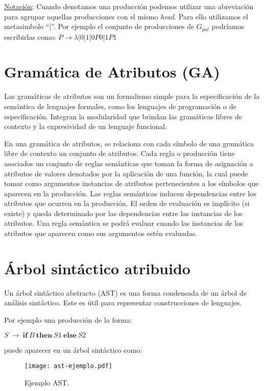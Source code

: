 \underline{Notación}: Cuando denotamos una producción podemos utilizar una abreviación para agrupar aquellas producciones con el mismo \textit{head}. Para ello utilizamos el metasimbolo ``|''. Por ejemplo el conjunto de producciones de $G_{pal}$ podríamos escribirlas como: $P \rightarrow \lambda | 0 | 1 | 0P0 | 1P1$ 

\section{Gramática de Atributos (GA)}

Las gramáticas de atributos son un formalismo simple para la especificación de la semántica de lenguajes formales, como los lenguajes de programación o de especificación. Integran la modularidad que brindan las gramáticas libres de contexto y la expresividad de un lenguaje funcional.

En una gramática de atributos, se relaciona con cada símbolo de una gramática libre de contexto un conjunto de atributos. Cada regla o producción tiene asociados un conjunto de reglas semánticas que toman la forma de asignación a atributos de valores denotados por la aplicación de una función, la cual puede tomar como argumentos instancias de atributos pertenecientes a los símbolos que aparecen en la producción.
Las reglas semánticas inducen dependencias entre los atributos que ocurren en la producción. El orden de evaluación es implícito (si existe) y queda determinado por las dependencias entre las instancias de los atributos.
Una regla semántica se podrá evaluar cuando las instancias de los atributos que aparecen como sus argumentos estén evaluadas. 



\section{Árbol sintáctico atribuido}

Un árbol sintáctico abstracto (AST) es una forma condensada de un árbol de análisis sintáctico. Este es útil para representar construcciones de lenguajes.

Por ejemplo una producción de la forma:
\begin{center}\large
$S\ \rightarrow\ \textbf{if}\ B\ \textbf{then}\ S1\ \textbf{else}\ S2$                                                                      \end{center}
puede aparecer en un árbol sintáctico como:

\begin{figure}[h!]\centering
\texttt{[image: ast-ejemplo.pdf]}
\caption{\label{ejem-ast} Ejemplo AST.}
\end{figure}


